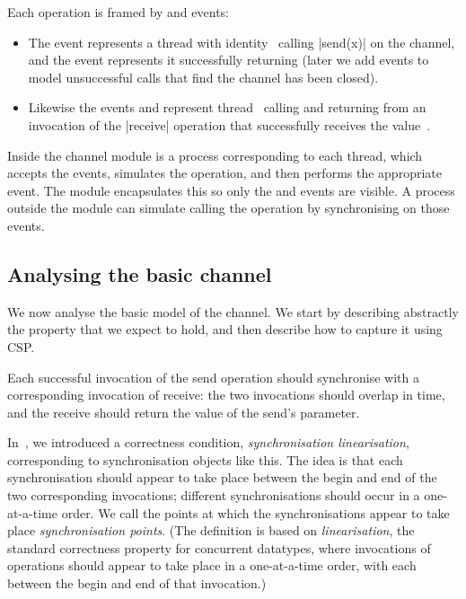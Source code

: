 Each operation is framed by  and  events:
%
\begin{itemize}
\item The event  represents a thread with
  identity~ calling |send(x)| on the channel, and the event
   represents it successfully returning (later we
  add events to model unsuccessful calls that find the channel has
  been closed).

\item Likewise the events  and
   represent thread~ calling and
  returning from an invocation of the |receive| operation that successfully
  receives the value~.
\end{itemize}
%
Inside the channel module is a process corresponding to each thread, which
accepts the  events, simulates the operation, and then performs
the appropriate  event.  The module encapsulates this so only the
 and  events are visible.  A process outside the module
can simulate calling the operation by synchronising on those events.


\subsection{Analysing the basic channel}

We now analyse the basic model of the channel.  We start by describing
abstractly the property that we expect to hold, and then describe how to
capture it using CSP.

Each successful invocation of the send operation should synchronise with a
corresponding invocation of receive: the two invocations should overlap in
time, and the receive should return the value of the send's parameter.

In~\cite{LL:synchronisation}, we introduced a correctness condition,
\emph{synchronisation linearisation}, corresponding to synchronisation objects
like this.  The idea is that each synchronisation should appear to take place
between the begin and end of the two corresponding invocations; different
synchronisations should occur in a one-at-a-time order.  We call the points at
which the synchronisations appear to take place \emph{synchronisation points}.
(The definition is based on \emph{linearisation}, the standard correctness
property for concurrent datatypes, where invocations of operations should
appear to take place in a one-at-a-time order, with each between the begin and
end of that invocation.)

